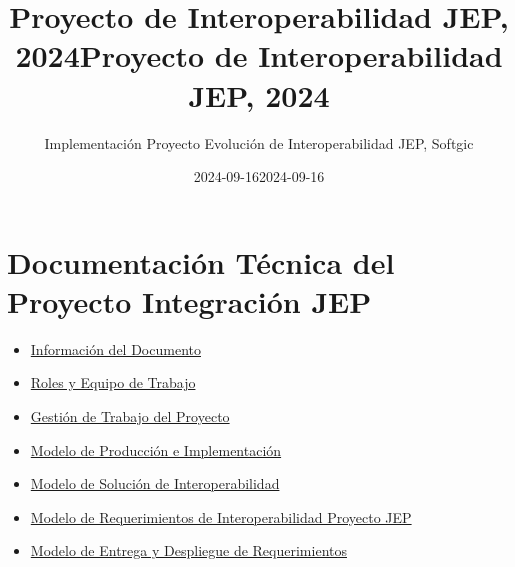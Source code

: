 \documentclass[
  paper=a4,
  ,captions=tableheading
]{scrartcl}
\title{Proyecto de Interoperabilidad JEP, 2024}
\subtitle{Implementación Proyecto Evolución de Interoperabilidad JEP,
Softgic}
\author{}
\date{2024-09-16}
\title{Proyecto de Interoperabilidad JEP, 2024}
\author{}
\date{2024-09-16}
\providecommand{\tightlist}{%
  \setlength{\itemsep}{0pt}\setlength{\parskip}{0pt}}
\begin{document}
\begin{titlepage}
\newcommand{\colorRule}[3][black]{\textcolor[HTML]{#1}{\rule{#2}{#3}}}
\end{titlepage}
\restoregeometry
{}




\section{Documentación Técnica del Proyecto Integración
JEP}\label{sec:documentaciuxf3n-tuxe9cnica-del-proyecto-integraciuxf3n-jep}

\begin{itemize}
\tightlist
\item
  \hyperref[informaciuxf3n-del-documento]{Información del Documento}
\item
  \hyperref[roles-y-equipo-de-trabajo]{Roles y Equipo de Trabajo}
\item
  \hyperref[gestiuxf3n-de-trabajo-del-proyecto]{Gestión de Trabajo del
  Proyecto}
\item
  \hyperref[modelo-de-producciuxf3n-e-implementaciuxf3n]{Modelo de
  Producción e Implementación}
\item
  \hyperref[modelo-de-soluciuxf3n-de-interoperabilidad]{Modelo de
  Solución de Interoperabilidad}
\item
  \hyperref[modelo-de-requerimientos-de-interoperabilidad-proyecto-jep]{Modelo
  de Requerimientos de Interoperabilidad Proyecto JEP}
\item
  \hyperref[modelo-de-entrega-y-despliegue-de-requerimientos]{Modelo de
  Entrega y Despliegue de Requerimientos}
\end{itemize}
\end{document}
